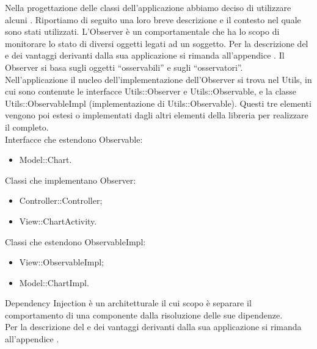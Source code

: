         Nella progettazione delle classi dell'applicazione abbiamo deciso di utilizzare alcuni . Riportiamo di seguito una loro breve descrizione e il contesto nel quale sono stati utilizzati.
            L'Observer è un  comportamentale che ha lo scopo di monitorare lo stato di diversi oggetti legati ad un soggetto.
            Per la descrizione del  e dei vantaggi derivanti dalla sua applicazione si rimanda all'appendice .
                Il  Observer si basa sugli oggetti “osservabili” e sugli “osservatori”. \\ Nell'applicazione  il nucleo dell'implementazione dell'Observer si trova nel  Utils, in cui sono contenute le interfacce Utils::Observer e Utils::Observable, e la classe Utils::ObservableImpl (implementazione di Utils::Observable). Questi tre elementi vengono poi estesi o implementati dagli altri elementi della libreria per realizzare il  completo.\\
                Interfacce che estendono Observable:
                \begin{itemize}
                    \item Model::Chart.
                \end{itemize}
                Classi che implementano Observer:
                \begin{itemize}
                    \item Controller::Controller;
                    \item View::ChartActivity.
                \end{itemize}
                Classi che estendono ObservableImpl:
                \begin{itemize}
                    \item View::ObservableImpl;
                    \item Model::ChartImpl.
                \end{itemize}
            Dependency Injection è un  architetturale il cui scopo è separare il comportamento di una componente dalla risoluzione delle sue dipendenze.\\
            Per la descrizione del  e dei vantaggi derivanti dalla sua applicazione si rimanda all'appendice .
